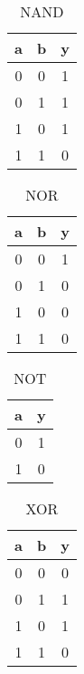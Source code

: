 \documentclass[a4paper]{article}
\begin{document}
\begin{table}[h]
\centering\caption{NAND}
\begin{tabular}{c c|c}
a & b & y \\ \hline
0 & 0 & 1\\
0 & 1 & 1\\
1 & 0 & 1\\
1 & 1 & 0\\
\end{tabular}
\end{table}

\begin{table}[h]
\centering\caption{NOR}
\begin{tabular}{c c|c}
a & b & y \\ \hline
0 & 0 & 1\\
0 & 1 & 0\\
1 & 0 & 0\\
1 & 1 & 0\\
\end{tabular}
\end{table}

\begin{table}[h]
\centering\caption{NOT}
\begin{tabular}{c|c}
a & y \\ \hline
0 & 1\\
1 & 0\\

\end{tabular}
\end{table}

\begin{table}[h]
\centering\caption{XOR}
\begin{tabular}{c c|c}
a & b & y \\ \hline
0 & 0 & 0\\
0 & 1 & 1\\
1 & 0 & 1\\
1 & 1 & 0\\
\end{tabular}
\end{table}
\end{document}
